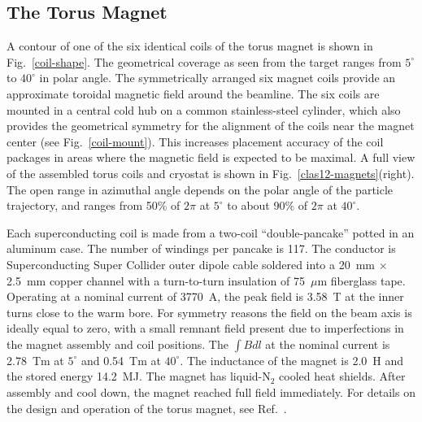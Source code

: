 \documentclass[final,3p,twocolumn]{elsarticle}
\begin{document}
\subsection{The Torus Magnet}
\label{torus}

A contour of one of the six identical coils of the torus magnet is shown in Fig.~\ref{coil-shape}. The geometrical
coverage as seen from the target ranges from $5^\circ$ to $40^\circ$ in polar angle. The symmetrically arranged six
magnet coils provide an approximate toroidal magnetic field around the beamline. The six coils are mounted in a
central cold hub on a common stainless-steel cylinder, which also provides the geometrical symmetry for the alignment
of the coils near the magnet center (see Fig.~\ref{coil-mount}). This increases placement accuracy of the coil
packages in areas where the magnetic field is expected to be maximal. A full view of the assembled torus coils and
cryostat is shown in Fig.~\ref{clas12-magnets}(right). The open range in azimuthal angle depends on the polar angle
of the particle trajectory, and ranges from 50\% of $2\pi$ at $5^\circ$ to about 90\% of $2\pi$ at $40^\circ$.

Each superconducting coil is made from a two-coil ``double-pancake'' potted in an aluminum case. The number of
windings per pancake is 117. The conductor is Superconducting Super Collider outer dipole cable soldered into 
a 20~mm $\times$ 2.5~mm copper channel with a turn-to-turn insulation of 75~$\mu$m fiberglass tape. Operating
at a nominal current of 3770~A, the peak field is 3.58~T at the inner turns close to the warm bore. For symmetry
reasons the field on the beam axis is ideally equal to zero, with a small remnant field present due to imperfections in
the magnet assembly and coil positions. The $\int \!\! B dl$ at the nominal current is 2.78~Tm at $5^\circ$ and 0.54~Tm
at $40^\circ$. The inductance of the magnet is 2.0~H and the stored energy 14.2~MJ. The magnet has liquid-N$_2$
cooled heat shields. After assembly and cool down, the magnet reached full field immediately. For details on the
design and operation of the torus magnet, see Ref.~\cite{clas12-magnets}.
\end{document}
